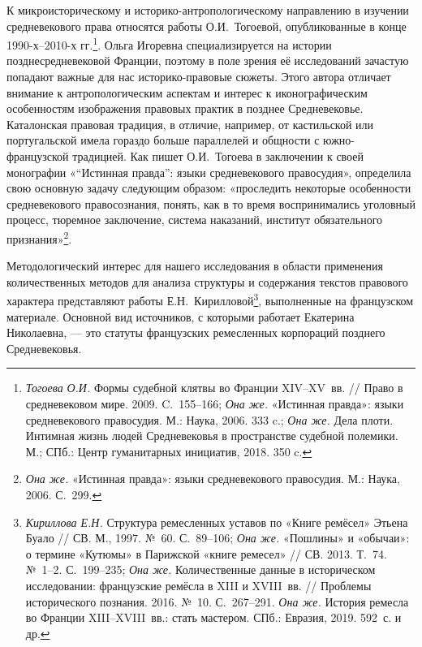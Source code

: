 К микроисторическому и историко-антропологическому направлению в изучении средневекового права относятся работы О.И.~Тогоевой, опубликованные в конце 1990-х--2010-х гг.\footnote{\emph{Тогоева}\emph{ О.И.} Формы судебной клятвы во Франции XIV--XV~вв. // Право в средневековом мире. 2009. C.~155--166; \emph{Она же.} «Истинная правда»: языки средневекового правосудия. М.: Наука, 2006. 333 c.; \emph{Она же.} Дела плоти. Интимная жизнь людей Средневековья в пространстве судебной полемики. М.; СПб.: Центр гуманитарных инициатив, 2018. 350 c.}. Ольга Игоревна специализируется на истории позднесредневековой Франции, поэтому в поле зрения её исследований зачастую попадают важные для нас историко-правовые сюжеты. Этого автора отличает внимание к антропологическим аспектам и интерес к иконографическим особенностям изображения правовых практик в позднее Средневековье. Каталонская правовая традиция, в отличие, например, от кастильской или португальской имела гораздо больше параллелей и общности с южно-французской традицией. Как пишет О.И.~Тогоева в заключении к своей монографии «“Истинная правда”: языки средневекового правосудия», определила свою основную задачу следующим образом: «проследить некоторые особенности средневекового правосознания, понять, как в то время воспринимались уголовный процесс, тюремное заключение, система наказаний, институт обязательного признания»\footnote{\emph{Она же.} «Истинная правда»: языки средневекового правосудия. М.: Наука, 2006. С.~299.}.

Методологический интерес для нашего исследования в области применения количественных методов для анализа структуры и содержания текстов правового характера представляют работы Е.Н.~Кирилловой\footnote{\emph{Кириллова Е.Н.} Структура ремесленных уставов по «Книге ремёсел» Этьена Буало // СВ. М., 1997. №~60. С.~89--106; \emph{Она же.} «Пошлины» и «обычаи»: о термине «Кутюмы» в Парижской «книге ремесел» // СВ. 2013. Т.~74. №~1--2. С.~199--235; \emph{Она же. }Количественные данные в историческом исследовании: французские ремёсла в XIII и XVIII~вв. // Проблемы исторического познания. 2016. №~10. С.~267--291. \emph{Она же.} История ремесла во Франции XIII--XVIII~вв.: стать мастером. СПб.: Евразия, 2019. 592~с. и др.}, выполненные на французском материале. Основной вид источников, с которыми работает Екатерина Николаевна, --- это статуты французских ремесленных корпораций позднего Средневековья.

